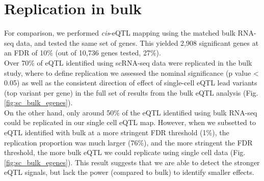 \newpage

\section{Replication in bulk}

For comparison, we performed \textit{cis}-eQTL mapping using the matched bulk RNA-seq data, 
and tested the same set of genes. 
This yielded 2,908 significant genes at an FDR of 10\% (out of 10,736 genes tested, 27\%). \\

Over 70\% of eQTL identified using scRNA-seq data were replicated in the bulk study, where to define replication we assessed the nominal significance (p value < 0.05) as well as the consistent direction of effect of single-cell eQTL lead variants (top variant per gene) in the full set of results from the bulk eQTL analysis (Fig. \ref{fig:sc_bulk_egenes}). \\

On the other hand, only around 50\% of the eQTL identified using bulk RNA-seq could be replicated
in our single cell eQTL map.
However, when we subsetted to eQTL identified with bulk at a more stringent FDR threshold (1\%), the replication proportion was much larger (76\%), and the more stringent the FDR threshold, the more bulk eQTL we could replicate using single cell data (Fig. \ref{fig:sc_bulk_egenes}).
This result suggests that we are able to detect the stronger eQTL signals, but lack the power (compared to bulk) to identify smaller effects.\\

